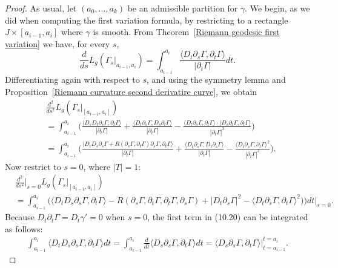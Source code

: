 \begin{proof}
As usual, let $(a_0,\dots,a_k)$ be an admissible partition for $\gamma$. We begin, as we did when computing the first variation formula, by restricting to a rectangle 
$J\times[a_{i-1},a_i]$ where $\gamma$ is smooth. From Theorem~\ref{Riemann geodesic first variation} we have,
for every $s$,
\[\frac{d}{ds}L_g(\Gamma_s|_{a_{i-1},a_i})=\int_{a_{i-1}}^{a_i}\frac{\langle D_t\partial_s\Gamma,\partial_t\Gamma\rangle}{|\partial_t\Gamma|}dt.\]
Differentiating again with respect to $s$, and using the symmetry lemma and Proposition~\ref{Riemann curvature second derivatire curve}, we obtain
\begin{align*}
&\frac{d^2}{ds^2}L_g(\Gamma_s|_{[a_{i-1},a_i]})\\
&=\int_{a_{i-1}}^{a_i}\Big(\frac{\langle D_sD_t\partial_s\Gamma,\partial_t\Gamma\rangle}{|\partial_t\Gamma|}+\frac{\langle D_t\partial_s\Gamma,D_s\partial_t\Gamma\rangle}{|\partial_t\Gamma|}-\frac{\langle D_t\partial_s\Gamma,\partial_t\Gamma\rangle\cdot\langle D_s\partial_t\Gamma,\partial_t\Gamma\rangle}{|\partial_t\Gamma|^3}\Big)\\
&=\int_{a_{i-1}}^{a_i}\Big(\frac{\langle D_tD_s\partial_s\Gamma+R(\partial_s\Gamma,\partial_t\Gamma)\partial_s\Gamma,\partial_t\Gamma\rangle}{|\partial_t\Gamma|}+\frac{\langle D_t\partial_s\Gamma,D_t\partial_s\Gamma\rangle}{|\partial_t\Gamma|}-\frac{\langle D_t\partial_s\Gamma,\partial_t\Gamma\rangle^2}{|\partial_t\Gamma|^3}\Big).
\end{align*}
Now restrict to $s=0$, where $|T|=1$:
\begin{equation}\label{Riemann second variation-1}
\begin{aligned}
&\frac{d^2}{ds^2}\Big|_{s=0}L_g(\Gamma_s|_{[a_{i-1},a_i]})\\
&=\int_{a_{i-1}}^{a_i}\big(\langle D_tD_s\partial_s\Gamma,\partial_t\Gamma\rangle-R(\partial_s\Gamma,\partial_t\Gamma,\partial_t\Gamma,\partial_s\Gamma)+|D_t\partial_s\Gamma|^2-\langle D_t\partial_s\Gamma,\partial_t\Gamma\rangle^2)\big)dt\Big|_{s=0}.
\end{aligned}
\end{equation}
Because $D_t\partial_t\Gamma=D_t\gamma'=0$ when $s=0$, the first term in (10.20) can be integrated as follows:
\begin{align}\label{Riemann second variation-2}
\int_{a_{i-1}}^{a_i}\langle D_tD_s\partial_s\Gamma,\partial_t\Gamma\rangle dt=\int_{a_{i-1}}^{a_i}\frac{d}{dt}\langle D_s\partial_s\Gamma,\partial_t\Gamma\rangle dt=\langle D_s\partial_s\Gamma,\partial_t\Gamma\rangle\Big|_{t=a_{i-1}}^{t=a_i}.

\end{align}
\end{proof}
